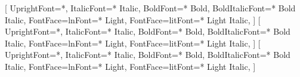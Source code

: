 
\geometry{left=1.4cm, top=.9cm, right=1.4cm, bottom=1.6cm, footskip=.5cm}

\renewcommand{\acvHeaderSocialSep}{\quad\textbar\quad}



\setmainfont{Source Sans 3}[
  UprightFont=*, ItalicFont=* Italic, BoldFont=* Bold, BoldItalicFont=* Bold Italic,
  FontFace={l}{n}{Font=* Light}, FontFace={l}{it}{Font=* Light Italic},
]
\setsansfont{Source Sans 3}[
  UprightFont=*, ItalicFont=* Italic, BoldFont=* Bold, BoldItalicFont=* Bold Italic,
  FontFace={l}{n}{Font=* Light}, FontFace={l}{it}{Font=* Light Italic},
]
\renewfontfamily{}[
  UprightFont=*, ItalicFont=* Italic, BoldFont=* Bold, BoldItalicFont=* Bold Italic,
  FontFace={l}{n}{Font=* Light}, FontFace={l}{it}{Font=* Light Italic},
]
